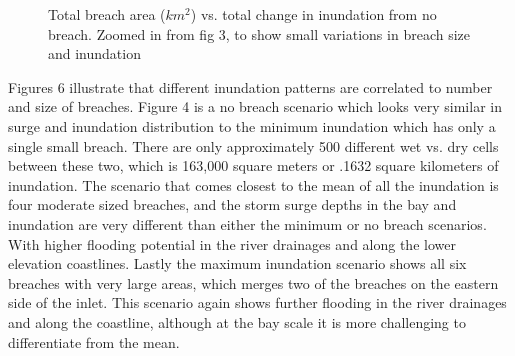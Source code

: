 \documentclass{coastal_paper}
\begin{document}
\begin{figure}
\label{fig4}
\caption{ Total breach area ($km^2$) vs. total change in inundation from no breach. Zoomed in from fig 3, to show small variations in breach size and inundation}
\end{figure}


Figures 6 illustrate that different inundation patterns are correlated to number and size of breaches. Figure 4 is a no breach scenario which looks very similar in surge and inundation distribution to the minimum inundation which has only a single small breach. There are only approximately 500 different wet vs. dry cells between these two, which is 163,000 square meters or .1632 square kilometers of inundation. The scenario that comes closest to the mean of all the inundation is four moderate sized breaches, and the storm surge depths in the bay and inundation are very different than either the minimum or no breach scenarios. With higher flooding potential in the river drainages and along the lower elevation coastlines. Lastly the maximum inundation scenario shows all six breaches with very large areas, which merges two of the breaches on the eastern side of the inlet. This scenario again shows further flooding in the river drainages and along the coastline, although at the bay scale it is more challenging to differentiate from the mean.
\end{document}
